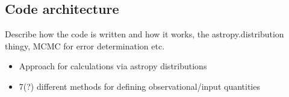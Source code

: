 \documentclass{aastex63}
\newcommand\aastex{AAS\TeX}
\begin{document}
%
%
%
%
%
%
%
%

\subsection{Code architecture}
\label{subsec:code}

Describe how the code is written and how it works, the astropy.distribution thingy, MCMC for error determination etc.
\begin{itemize}
  \item Approach for calculations via astropy distributions
  \item 7(?) different methods for defining observational/input quantities
\end{itemize}
\end{document}
